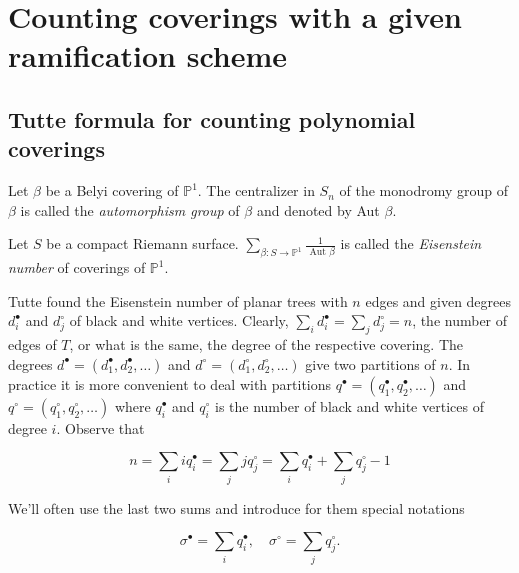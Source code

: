 \vskip5pt

\section{Counting coverings with a given ramification scheme}



\subsection{Tutte formula for counting polynomial coverings}

\begin{dfn}
     Let $\beta$ be a Belyi covering of $\mathbb{P}^{1}$. The centralizer in $S_{n}$ of the monodromy group of $\beta$ is called the \textit{automorphism group} of $\beta$ and denoted by Aut $\beta$.
\end{dfn}

\begin{dfn}
    Let $S$ be a compact Riemann surface. $\sum_{\beta: S \rightarrow \mathbb{P}^{1}} \frac{1}{\text { Aut } \beta}$ is called the \textit{Eisenstein number} of coverings of $\mathbb{P}^{1}$.
\end{dfn}


Tutte found the Eisenstein number of planar trees with $n$ edges and given degrees $d_{i}^{\bullet}$ and $d_{j}^{\circ}$ of black and white vertices. Clearly, $\sum_{i} d_{i}^{\bullet}=\sum_{j} d_{j}^{\circ}=n$, the number of edges of $T$, or what is the same, the degree of the respective covering. The degrees $d^{\bullet}=\left(d_{1}^{\bullet}, d_{2}^{\bullet}, \ldots\right)$ and $d^{\circ}=\left(d_{1}^{\circ}, d_{2}^{\circ}, \ldots\right)$ give two partitions of $n$. In practice it is more convenient to deal with partitions $q^{\bullet}=\left(q_{1}^{\bullet}, q_{2}^{\bullet}, \ldots\right)$ and $q^{\circ}=\left(q_{1}^{\circ}, q_{2}^{\circ}, \ldots\right)$ where $q_{i}^{\bullet}$ and $q_{i}^{\circ}$ is the number of black and white vertices of degree $i$. Observe that


\begin{equation*}
n=\sum_{i} i q_{i}^{\bullet}=\sum_{j} j q_{j}^{\circ}=\sum_{i} q_{i}^{\bullet}+\sum_{j} q_{j}^{\circ}-1 
\end{equation*}


We'll often use the last two sums and introduce for them special notations


\begin{equation*}
\sigma^{\bullet}=\sum_{i} q_{i}^{\bullet}, \quad \sigma^{\circ}=\sum_{j} q_{j}^{\circ} . 
\end{equation*}


